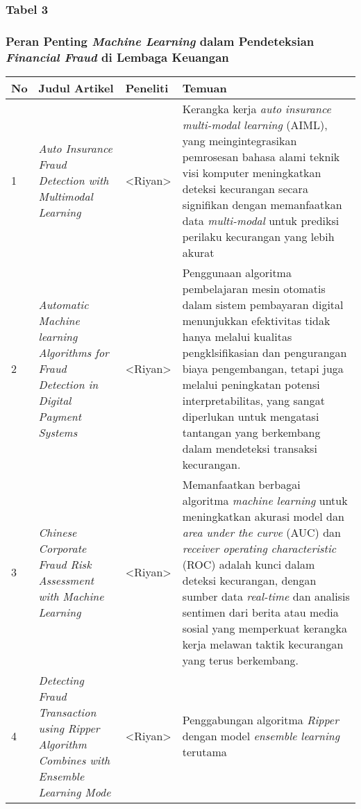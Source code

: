 \documentclass[12pt, a4paper]{article}
\begin{document}
\begin{center}
    \renewcommand{\arraystretch}{1.5}
    \subsubsection*{Tabel 3}
    \subsubsection*{Peran Penting \textit{Machine Learning} dalam Pendeteksian \textit{Financial Fraud} di Lembaga Keuangan}
    \begin{longtable}{|p{0.5cm}|p{3cm}|p{2.5cm}|p{5cm}|}
        \hline
        No & Judul Artikel & Peneliti & Temuan \\
        \hline
        1 & \textit{Auto Insurance Fraud Detection with Multimodal Learning} &
        <Riyan> & 
        Kerangka kerja \textit{auto insurance multi-modal learning}
        (AIML), yang meingintegrasikan pemrosesan bahasa alami teknik visi 
        komputer meningkatkan deteksi kecurangan  secara  signifikan  dengan memanfaatkan data \textit{multi-modal}
        untuk  prediksi  perilaku  kecurangan yang lebih akurat \\
        \hline
        2 & \textit{Automatic  Machine learning  Algorithms for  Fraud  Detection in  Digital  Payment Systems} &
        <Riyan> & 
        Penggunaan algoritma pembelajaran mesin otomatis dalam sistem pembayaran digital menunjukkan efektivitas
        tidak hanya melalui kualitas pengklsifikasian dan pengurangan biaya pengembangan, tetapi
        juga melalui peningkatan potensi interpretabilitas, yang sangat diperlukan untuk mengatasi tantangan yang berkembang
        dalam mendeteksi transaksi kecurangan. \\
        \hline
        3 & \textit{Chinese  Corporate Fraud Risk Assessment    with Machine Learning} &
        <Riyan> &
        Memanfaatkan berbagai algoritma \textit{machine learning} untuk meningkatkan akurasi model dan 
        \textit{area under the curve} (AUC) dan \textit{receiver operating characteristic} (ROC) adalah kunci
        dalam deteksi kecurangan, dengan sumber data \textit{real-time} dan analisis sentimen dari berita atau
        media sosial yang memperkuat kerangka kerja melawan taktik kecurangan yang terus berkembang. \\
        \hline
        4 & \textit{Detecting Fraud Transaction using Ripper Algorithm Combines with Ensemble  Learning Mode} &
        <Riyan> &
        Penggabungan algoritma \textit{Ripper} dengan model \textit{ensemble learning} terutama

\end{longtable}
\end{center}
\end{document}
